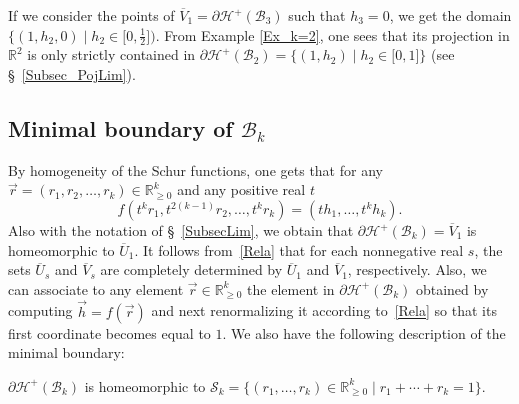 \documentclass[ALCO,ThmDefs,Unicode,epreuves]{cedram}
\begin{document}
\begin{rema}
\label{rem_badRest}If we consider the points of $\overline{V}_{1}%
=\partial\mathcal{H}^{+}(\mathcal{B}_{3})$ such that $h_{3}=0$, we get the
domain $\{(1,h_{2},0)\mid h_{2}\in\lbrack0,\frac{1}{2}])$. From Example
\ref{Ex_k=2}, one sees that its projection in $\mathbb{R}^{2}$ is only
strictly contained in $\partial\mathcal{H}^{+}(\mathcal{B}_{2})=\{(1,h_{2}%
)\mid h_{2}\in\lbrack0,1]\}$ (see \S~\ref{Subsec_PojLim}).
\end{rema}

\subsection{Minimal boundary of \texorpdfstring{$\mathcal{B}_{k}$}{Bk}}

By homogeneity of the Schur functions, one gets that for any $\vec{r}%
=(r_{1},r_{2},\ldots,r_{k})\in\mathbb{R}_{\geq0}^{k}$ and any positive real
$t$%
\begin{equation}
f(t^{k}r_{1},t^{2(k-1)}r_{2},\ldots,t^{k}r_{k})=(th_{1},\ldots,t^{k}h_{k}).
\label{Rela}%
\end{equation}
Also with the notation of \S~\ref{SubsecLim}, we obtain that $\partial
\mathcal{H}^{+}(\mathcal{B}_{k})=\overline{V}_{1}$ is homeomorphic to
$\overline{U}_{1}$. It follows from~\eqref{Rela} that for each nonnegative
real $s$, the sets $\overline{U}_{s}$ and $\overline{V}_{s}$ are completely
determined by $\overline{U}_{1}$ and $\overline{V}_{1}$, respectively. Also,
we can associate to any element $\vec{r}\in\mathbb{R}_{\geq0}^{k}$ the element
in $\partial\mathcal{H}^{+}(\mathcal{B}_{k})$ obtained by computing $\vec
{h}=f(\vec{r})$ and next renormalizing it according to~\eqref{Rela} so that
its first coordinate becomes equal to $1$. We also have the following
description of the minimal boundary:

\begin{prop}
$\partial\mathcal{H}^{+}(\mathcal{B}_{k})$ is homeomorphic to $\mathcal{S}%
_{k}=\{(r_{1},\ldots,r_{k})\in\mathbb{R}_{\geq0}^{k}\mid r_{1}+\cdots
+r_{k}=1\}$.
\end{prop}
\end{document}
